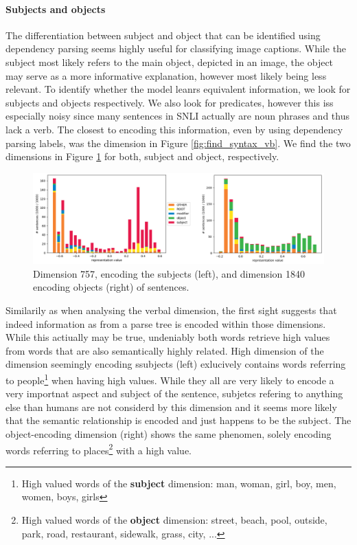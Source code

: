 \paragraph*{Subjects and objects}
The differentiation between subject and object that can be identified using dependency parsing seems highly useful for classifying image captions. While the subject most likely refers to the main object, depicted in an image, the object may serve as a more informative explanation, however most likely being less relevant. To identify whether the model leanrs equivalent information, we look for subjects and objects respectively. We also look for predicates, however this iss especially noisy since many sentences in \ac{SNLI} actually are noun phrases and thus lack a verb. The closest to encoding this information, even by using dependency parsing labels, was the dimension in Figure \ref{fig:find_syntax_vb}. We find the two dimensions in Figure \ref{fig:find_syntax_subj_obj} for both, subject and object, respectively.
\begin{figure}[tph!]
\centering
	\includegraphics[totalheight=5cm]{fig/find_syntax_subj_obj.png}
	\caption{Dimension 757, encoding the subjects (left), and dimension 1840 encoding objects (right) of sentences.}
	\label{fig:find_syntax_subj_obj}
\end{figure}
Similarily as when analysing the verbal dimension, the first sight suggests that indeed information as from a parse tree is encoded within those dimensions. While this actiually may be true, undeniably both words retrieve high values from words that are also semantically highly related. High dimension of the dimension seemingly encoding ssubjects (left) exlucively contains words referring to people\footnote{High valued words of the \textbf{subject} dimension: man, woman, girl, boy, men, women, boys, girls} when having high values. While they all are very likely to encode a very importnat aspect and subject of the sentence, subjetcs refering to anything else than humans are not considerd by this dimension and it seems more likely that the semantic relationship is encoded and just happens to be the subject. The object-encoding dimension (right) shows the same phenomen, solely encoding words referring to places\footnote{High valued words of the \textbf{object} dimension: street, beach, pool, outside, park, road, restaurant, sidewalk, grass, city, ...} with a high value.
\newline

